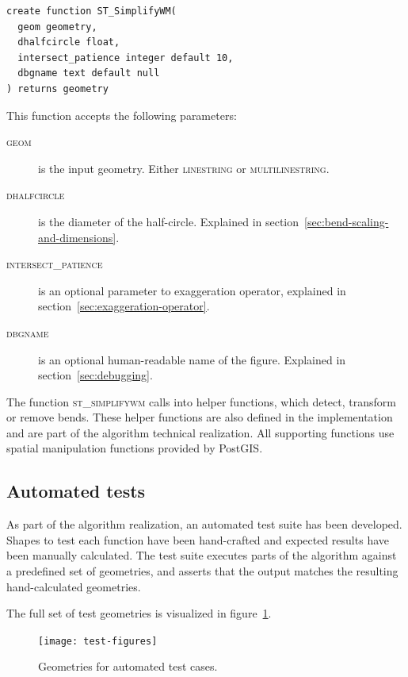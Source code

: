 \documentclass[a4paper]{article}
\begin{document}
\begin{verbatim}
create function ST_SimplifyWM(
  geom geometry,
  dhalfcircle float,
  intersect_patience integer default 10,
  dbgname text default null
) returns geometry
\end{verbatim}

This function accepts the following parameters:
\begin{description}

    \item[\normalfont\textsc{geom}] is the input geometry. Either
        \textsc{linestring} or \textsc{multilinestring}.

    \item[\normalfont\textsc{dhalfcircle}] is the diameter of the half-circle.
        Explained in section~\ref{sec:bend-scaling-and-dimensions}.

    \item[\normalfont\textsc{intersect\_patience}] is an optional parameter to
        exaggeration operator, explained in
        section~\ref{sec:exaggeration-operator}.

    \item[\normalfont\textsc{dbgname}] is an optional human-readable name of
        the figure. Explained in section~\ref{sec:debugging}.

\end{description}

The function \textsc{st\_simplifywm} calls into helper functions, which detect,
transform or remove bends. These helper functions are also defined in the
implementation and are part of the algorithm technical realization. All
supporting functions use spatial manipulation functions provided by PostGIS.

\subsection{Automated tests}
\label{sec:automated-tests}

As part of the algorithm realization, an automated test suite has been
developed. Shapes to test each function have been hand-crafted and expected
results have been manually calculated. The test suite executes parts of the
algorithm against a predefined set of geometries, and asserts that the output
matches the resulting hand-calculated geometries.

The full set of test geometries is visualized in figure~\ref{fig:test-figures}.

\begin{figure}[ht]
    \centering
    \texttt{[image: test-figures]}
    \caption{Geometries for automated test cases.}
    \label{fig:test-figures}
\end{figure}
\end{document}
